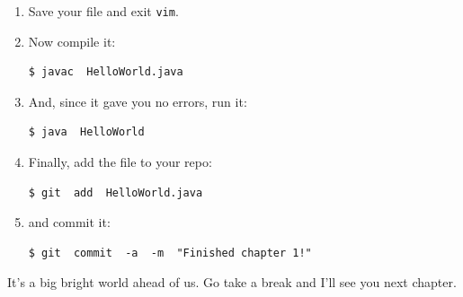 \begin{enumerate}
\item Save your file and exit \texttt{vim}.

\item Now compile it:
\begin{Verbatim}[fontsize=\small]
$ javac  HelloWorld.java
\end{Verbatim}

\item And, since it gave you no errors, run it:
\begin{Verbatim}[fontsize=\small]
$ java  HelloWorld
\end{Verbatim}

\item Finally, add the file to your repo:
\begin{Verbatim}[fontsize=\small]
$ git  add  HelloWorld.java
\end{Verbatim}

\item and commit it:
\begin{Verbatim}[fontsize=\small]
$ git  commit  -a  -m  "Finished chapter 1!"
\end{Verbatim}

\end{enumerate}

It's a big bright world ahead of us. Go take a break and I'll see you next
chapter.
